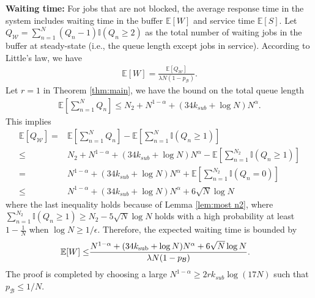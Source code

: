 \documentclass[11pt,oneside,letter]{article}
\begin{document}
\vspace{3 pt}

{\bf Waiting time:} 
For jobs that are not blocked, the average response time in the system includes waiting time in the buffer $\mathbb E[W]$ and service time $\mathbb E[S]$. 
Let $Q_{\mathcal W} = \sum_{n=1}^N(Q_n-1)\mathbb I(Q_n \geq 2)$ as the total number of waiting jobs in the buffer at steady-state (i.e., the queue length except jobs in service). 
According to Little's law, we have 
\begin{align}
    \mathbb E[W] = \frac{\mathbb E[Q_{\mathcal W}]}{\lambda N(1-p_{\mathcal B})}.  
\end{align}
Let $r=1$ in Theorem \ref{thm:main}, we have the bound on the total queue length  \begin{align*}
\mathbb E\left[\sum_{n=1}^{N} Q_n\right]  \leq N_2 + N^{1-\alpha} +(34k_{sub} + \log N)N^\alpha.
\end{align*}
This implies
\begin{align*}
\mathbb E\left[Q_{\mathcal W}\right] =& \mathbb E\left[\sum_{n=1}^{N} Q_n\right]  - \mathbb E\left[\sum_{n=1}^N\mathbb I(Q_n \geq 1)\right]  \\
\leq& N_2 + N^{1-\alpha} + (34k_{sub} + \log N)N^\alpha - \mathbb E\left[\sum_{n=1}^{N_2}\mathbb I(Q_n \geq 1)\right]\\
= & N^{1-\alpha} + (34k_{sub} + \log N)N^\alpha + \mathbb E\left[\sum_{n=1}^{N_2}\mathbb I(Q_n = 0)\right]\\
\leq& N^{1-\alpha} + (34k_{sub} + \log N)N^\alpha + 6\sqrt{N}\log N
\end{align*}
where the last inequality holds because of Lemma \ref{lem:most n2}, where $\sum_{n=1}^{N_2}\mathbb{I}(Q_n\geq 1) \geq N_2 - 5\sqrt{N} \log N$ holds with a high probability at least $1-\frac{1}{N}$ when $\log N \geq 1/\epsilon.$
Therefore, the expected waiting time is bounded by
\begin{align*}
\mathbb E[W]
\leq& \frac{N^{1-\alpha} + (34 k_{\rm sub} + \log N) N^\alpha + 6 \sqrt{N}\log N}{\lambda N (1-p_{\mathcal B})}. 
\end{align*}
The proof is completed by choosing a large $N^{1-\alpha} \geq 2r k_{sub} \log (17N)$ such that $p_{\mathcal B} \leq 1/N.$
\end{document}
